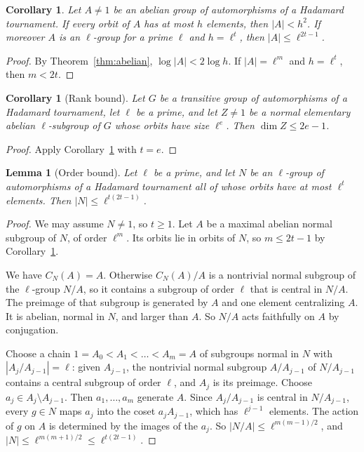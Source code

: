\documentclass[11pt]{amsart}
\newtheorem{lemma}[theorem]{Lemma}
\newtheorem{corollary}[theorem]{Corollary}
\theoremstyle{definition}
\theoremstyle{remark}
\begin{document}
\begin{corollary}\label{cor:abelianorder}
Let $A\ne1$ be an abelian group of automorphisms of a Hadamard tournament. If every orbit of $A$ has at most $h$ elements, then $|A|<h^2$. If moreover $A$ is an $\ell$-group for a prime $\ell$ and $h=\ell^t$, then $|A|\le\ell^{2t-1}$.
\end{corollary}
\begin{proof}
By Theorem~\ref{thm:abelian}, $\log|A|<2\log h$. If $|A|=\ell^m$ and $h=\ell^t$, then $m<2t$.
\end{proof}

\begin{corollary}[Rank bound]\label{lem:rankbound}
Let $G$ be a transitive group of automorphisms of a Hadamard tournament, let $\ell$ be a prime, and let $Z\ne1$ be a normal elementary abelian $\ell$-subgroup of $G$ whose orbits have size $\ell^e$. Then $\dim Z\le2e-1$.
\end{corollary}
\begin{proof}
Apply Corollary~\ref{cor:abelianorder} with $t=e$.
\end{proof}

\begin{lemma}[Order bound]\label{lem:orderbound}
Let $\ell$ be a prime, and let $N$ be an $\ell$-group of automorphisms of a Hadamard tournament all of whose orbits have at most $\ell^t$ elements. Then $|N|\le\ell^{t(2t-1)}$.
\end{lemma}
\begin{proof}
We may assume $N\ne1$, so $t\ge1$. Let $A$ be a maximal abelian normal subgroup of $N$, of order $\ell^m$. Its orbits lie in orbits of $N$, so $m\le2t-1$ by Corollary~\ref{cor:abelianorder}.

We have $C_N(A)=A$. Otherwise $C_N(A)/A$ is a nontrivial normal subgroup of the $\ell$-group $N/A$, so it contains a subgroup of order $\ell$ that is central in $N/A$. The preimage of that subgroup is generated by $A$ and one element centralizing $A$. It is abelian, normal in $N$, and larger than $A$. So $N/A$ acts faithfully on $A$ by conjugation.

Choose a chain $1=A_0<A_1<\dots<A_m=A$ of subgroups normal in $N$ with $|A_j/A_{j-1}|=\ell$: given $A_{j-1}$, the nontrivial normal subgroup $A/A_{j-1}$ of $N/A_{j-1}$ contains a central subgroup of order $\ell$, and $A_j$ is its preimage. Choose $a_j\in A_j\setminus A_{j-1}$. Then $a_1,\dots,a_m$ generate $A$. Since $A_j/A_{j-1}$ is central in $N/A_{j-1}$, every $g\in N$ maps $a_j$ into the coset $a_jA_{j-1}$, which has $\ell^{j-1}$ elements. The action of $g$ on $A$ is determined by the images of the $a_j$. So $|N/A|\le\ell^{m(m-1)/2}$, and $|N|\le\ell^{m(m+1)/2}\le\ell^{t(2t-1)}$.
\end{proof}
\end{document}
